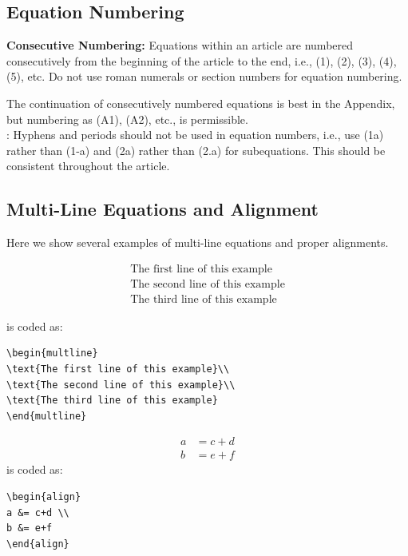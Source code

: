 \documentclass[lettersize,journal]{IEEEtran}
\begin{document}
\subsection{Equation Numbering}
{\bf{Consecutive Numbering:}} Equations within an article are numbered consecutively from the beginning of the
article to the end, i.e., (1), (2), (3), (4), (5), etc. Do not use roman numerals or section numbers for equation numbering.

 The continuation of consecutively numbered equations is best in the Appendix, but numbering
as (A1), (A2), etc., is permissible.\\

: Hyphens and periods should not be used in equation numbers, i.e., use (1a) rather than
(1-a) and (2a) rather than (2.a) for subequations. This should be consistent throughout the article.

\subsection{Multi-Line Equations and Alignment}
Here we show several examples of multi-line equations and proper alignments.

\begin{multline}
  \text{The first line of this example}\\
  \text{The second line of this example}\\
  \text{The third line of this example}
\end{multline}

\noindent is coded as:
\begin{verbatim}
\begin{multline}
\text{The first line of this example}\\
\text{The second line of this example}\\
\text{The third line of this example}
\end{multline}
\end{verbatim}

\begin{align}
  a & = c+d \\
  b & = e+f
\end{align}
\noindent is coded as:
\begin{verbatim}
\begin{align}
a &= c+d \\
b &= e+f
\end{align}
\end{verbatim}
\end{document}
